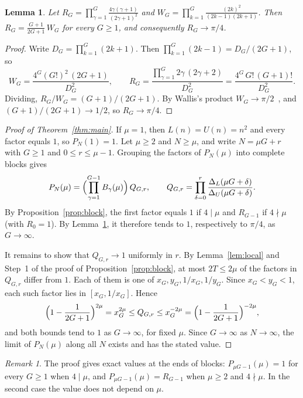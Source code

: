 \documentclass{amsart}
\newtheorem{lemma}{Lemma}
\theoremstyle{definition}
\theoremstyle{remark}
\newtheorem{remark}{Remark}
\newcommand{\DL}{\Delta_L}
\newcommand{\DU}{\Delta_U}
\begin{document}
\begin{lemma}\label{lem:wallis}
Let $R_G=\prod_{\gamma=1}^{G}\frac{4\gamma(\gamma+1)}{(2\gamma+1)^2}$ and $W_G=\prod_{k=1}^{G}\frac{(2k)^2}{(2k-1)(2k+1)}$. Then $R_G=\frac{G+1}{2G+1}\,W_G$ for every $G\ge1$, and consequently $R_G\to\pi/4$.
\end{lemma}

\begin{proof}
Write $D_G=\prod_{k=1}^{G}(2k+1)$. Then $\prod_{k=1}^{G}(2k-1)=D_G/(2G+1)$, so
\[
W_G=\frac{4^G(G!)^2\,(2G+1)}{D_G^2},\qquad
R_G=\frac{\prod_{\gamma=1}^G 2\gamma\,(2\gamma+2)}{D_G^2}=\frac{4^G\,G!\,(G+1)!}{D_G^2}.
\]
Dividing, $R_G/W_G=(G+1)/(2G+1)$. By Wallis's product $W_G\to\pi/2$~\cite{wallis_wolfram}, and $(G+1)/(2G+1)\to1/2$, so $R_G\to\pi/4$.
\end{proof}

\begin{proof}[Proof of Theorem~\ref{thm:main}]
If $\mu=1$, then $L(n)=U(n)=n^2$ and every factor equals $1$, so $P_N(1)=1$. Let $\mu\ge2$ and $N\ge\mu$, and write $N=\mu G+r$ with $G\ge1$ and $0\le r\le\mu-1$. Grouping the factors of $P_N(\mu)$ into complete blocks gives
\[
P_N(\mu)=\Bigl(\prod_{\gamma=1}^{G-1}B_\gamma(\mu)\Bigr)\,Q_{G,r},\qquad Q_{G,r}=\prod_{\delta=0}^{r}\frac{\DL(\mu G+\delta)}{\DU(\mu G+\delta)} .
\]
By Proposition~\ref{prop:block}, the first factor equals $1$ if $4\mid\mu$ and $R_{G-1}$ if $4\nmid\mu$ (with $R_0=1$). By Lemma~\ref{lem:wallis}, it therefore tends to $1$, respectively to $\pi/4$, as $G\to\infty$.

It remains to show that $Q_{G,r}\to1$ uniformly in $r$. By Lemma~\ref{lem:local} and Step~1 of the proof of Proposition~\ref{prop:block}, at most $2T\le2\mu$ of the factors in $Q_{G,r}$ differ from $1$. Each of them is one of $x_G,y_G,1/x_G,1/y_G$. Since $x_G<y_G<1$, each such factor lies in $[x_G,1/x_G]$. Hence
\[
\Bigl(1-\frac1{2G+1}\Bigr)^{2\mu}=x_G^{2\mu}\le Q_{G,r}\le x_G^{-2\mu}=\Bigl(1-\frac1{2G+1}\Bigr)^{-2\mu},
\]
and both bounds tend to $1$ as $G\to\infty$, for fixed $\mu$. Since $G\to\infty$ as $N\to\infty$, the limit of $P_N(\mu)$ along all $N$ exists and has the stated value.
\end{proof}

\begin{remark}\label{rem:exact}
The proof gives exact values at the ends of blocks: $P_{\mu G-1}(\mu)=1$ for every $G\ge1$ when $4\mid\mu$, and $P_{\mu G-1}(\mu)=R_{G-1}$ when $\mu\ge2$ and $4\nmid\mu$. In the second case the value does not depend on $\mu$.
\end{remark}
\end{document}
